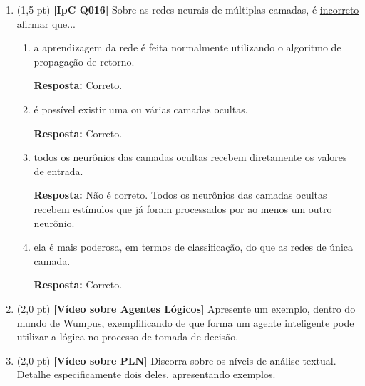 \documentclass[12pt,a4paper,oneside]{article}
\begin{document}
\begin{enumerate}
	\item (1,5 pt) {\bf [IpC Q016]} Sobre as redes neurais de múltiplas camadas, é \underline{incorreto} afirmar que...

\begin{enumerate}
\item a aprendizagem da rede é feita normalmente utilizando o algoritmo de propagação de retorno.

\vspace*{0.3cm}

{ \color{blue} {\bf Resposta:} Correto.}

\item é possível existir uma ou várias camadas ocultas.

\vspace*{0.3cm}

{ \color{blue} {\bf Resposta:} Correto.}

\item todos os neurônios das camadas ocultas recebem diretamente os valores de entrada.

\vspace*{0.3cm}

{ \color{red} {\bf Resposta:} Não é correto. Todos os neurônios das camadas ocultas recebem estímulos que já foram processados por ao menos um outro neurônio.}

\item ela é mais poderosa, em termos de classificação, do que as redes de única camada.

\vspace*{0.3cm}

{ \color{blue} {\bf Resposta:} Correto.}

\end{enumerate}
	
	 \item (2,0 pt) {\bf [Vídeo sobre Agentes Lógicos]} Apresente um exemplo, dentro do mundo de Wumpus, exemplificando de que forma um agente inteligente pode utilizar a lógica no processo de tomada de decisão.
	 
	  \item (2,0 pt) {\bf [Vídeo sobre PLN]} Discorra sobre os níveis de análise textual. Detalhe especificamente dois deles, apresentando exemplos.
	
	
\end{enumerate}
\end{document}
